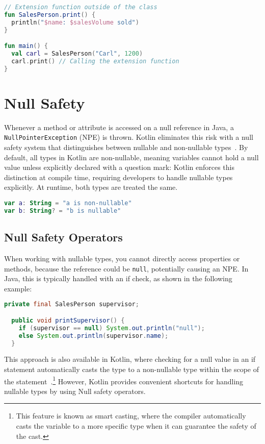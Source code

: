 \documentclass[a4paper,11pt]{article}
\begin{document}
\begin{lstlisting}[language=Kotlin, title={Extension Function}]
// Extension function outside of the class
fun SalesPerson.print() {
  println("$name: $salesVolume sold")
}

fun main() {
  val carl = SalesPerson("Carl", 1200)
  carl.print() // Calling the extension function
}
\end{lstlisting}

\section{Null Safety}
Whenever a method or attribute is accessed on a null reference in Java, a \texttt{NullPointerException} (NPE) is thrown. Kotlin eliminates this risk with a null safety system that distinguishes between nullable and non-nullable types~\cite{nullsafety,nullsafety-nullable-types}. By default, all types in Kotlin are non-nullable, meaning variables cannot hold a null value unless explicitly declared with a question mark:
Kotlin enforces this distinction at compile time, requiring developers to handle nullable types explicitly. At runtime, both types are treated the same.
\begin{lstlisting}[language=Kotlin]
var a: String = "a is non-nullable"
var b: String? = "b is nullable"
\end{lstlisting}

\subsection{Null Safety Operators}
When working with nullable types, you cannot directly access properties or methods, because the reference could be \texttt{null}, potentially causing an NPE\@.
In Java, this is typically handled with an if check, as shown in the following example:
\begin{lstlisting}[language=Java]
  private final SalesPerson supervisor;

  public void printSupervisor() {
    if (supervisor == null) System.out.println("null");
    else System.out.println(supervisor.name);
  }
\end{lstlisting}

This approach is also available in Kotlin, where checking for a null value in an if statement automatically casts the type to a non-nullable type within the scope of the statement~\cite{nullsafety-if-condition}.\footnote{This feature is known as smart casting, where the compiler automatically casts the variable to a more specific type when it can guarantee the safety of the cast.}
However, Kotlin provides convenient shortcuts for handling nullable types by using Null safety operators.
\end{document}
